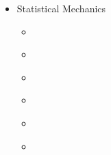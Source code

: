 \documentclass[letterpaper,10pt,english]{jupyterBook}
\begin{document}
\begin{itemize}
\item {} 
\sphinxAtStartPar
Statistical Mechanics

\begin{itemize}
\item {} 
\sphinxAtStartPar
{\hyperref[\detokenize{ch/statistical-mechanics/intro::doc}]{}}

\item {} 
\sphinxAtStartPar
{\hyperref[\detokenize{ch/statistical-mechanics/liouville-boltzmann::doc}]{}}

\item {} 
\sphinxAtStartPar
{\hyperref[\detokenize{ch/statistical-mechanics/notes::doc}]{}}

\item {} 
\sphinxAtStartPar
{\hyperref[\detokenize{ch/statistical-mechanics/statistics::doc}]{}}

\item {} 
\sphinxAtStartPar
{\hyperref[\detokenize{ch/statistical-mechanics/ising::doc}]{}}

\item {} 
\sphinxAtStartPar
{\hyperref[\detokenize{ch/statistical-mechanics/entropy::doc}]{}}

\end{itemize}
\end{itemize}
\end{document}
